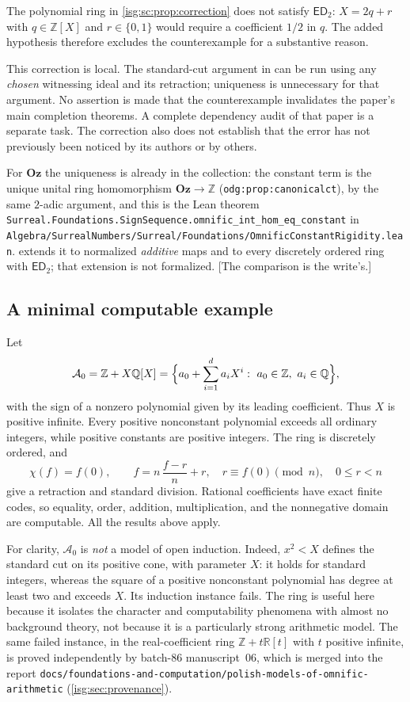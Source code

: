 \documentclass[11pt]{article}
\theoremstyle{definition}
\theoremstyle{remark}
\newcommand{\Oz}{\ensuremath{\mathbf{Oz}}}
\newcommand{\R}{\mathbb{R}}
\newcommand{\Z}{\mathbb{Z}}
\newcommand{\Q}{\mathbb{Q}}
\newcommand{\ED}{\mathsf{ED}}
\newcommand{\Asc}{\mathcal{A}}
\newcommand{\replabel}[1]{\nolinkurl{#1}}
\newcommand{\fn}[1]{\nolinkurl{#1}}
\begin{document}
The polynomial ring in \cref{isg:sc:prop:correction} does not satisfy
$\ED_2$: $X=2q+r$ with $q\in\Z[X]$ and $r\in\{0,1\}$ would require a
coefficient $1/2$ in $q$. The added hypothesis therefore excludes the
counterexample for a substantive reason.

This correction is local. The standard-cut argument in
\cite[Theorem~2.9]{ELV} can be run using any \emph{chosen} witnessing
ideal and its retraction; uniqueness is unnecessary for that argument. No
assertion is made that the counterexample invalidates the paper's main
completion theorems. A complete dependency audit of that paper is a
separate task. The correction also does not establish that the error has
not previously been noticed by its authors or by others.

For $\Oz$ the uniqueness is already in the collection: the constant term
is the unique unital ring homomorphism $\Oz\to\Z$
(\replabel{odg:prop:canonicalct}), by the same $2$-adic argument, and this
is the Lean theorem
\fn{Surreal.Foundations.SignSequence.omnific_int_hom_eq_constant} in
\fn{Algebra/SurrealNumbers/Surreal/Foundations/OmnificConstantRigidity.lean}.
 extends it to normalized \emph{additive} maps and
to every discretely ordered ring with $\ED_2$; that extension is not
formalized. \textup{[}The comparison is the write's.\textup{]}

\subsection{A minimal computable example}
Let
\begin{equation}\label{isg:sc:eq:A0}
 \Asc_0=\Z+X\Q[X]
 =\Bigl\{a_0+\sum_{i=1}^d a_iX^i:\ a_0\in\Z,\ a_i\in\Q\Bigr\},
\end{equation}
with the sign of a nonzero polynomial given by its leading coefficient.
Thus $X$ is positive infinite. Every positive nonconstant polynomial
exceeds all ordinary integers, while positive constants are positive
integers. The ring is discretely ordered, and
\[
 \chi(f)=f(0),\qquad
 f=n\,\frac{f-r}{n}+r,\quad r\equiv f(0)\pmod n,\quad 0\le r<n
\]
give a retraction and standard division. Rational coefficients have exact
finite codes, so equality, order, addition, multiplication, and the
nonnegative domain are computable. All the results above apply.

For clarity, $\Asc_0$ is \emph{not} a model of open induction. Indeed,
$x^2<X$ defines the standard cut on its positive cone, with parameter $X$:
it holds for standard integers, whereas the square of a positive
nonconstant polynomial has degree at least two and exceeds $X$. Its
induction instance fails. The ring is useful here because it isolates the
character and computability phenomena with almost no background theory,
not because it is a particularly strong arithmetic model. The same failed
instance, in the real-coefficient ring $\Z+t\R[t]$ with $t$ positive
infinite, is proved independently by batch-86 manuscript~06, which is
merged into the report
\nolinkurl{docs/foundations-and-computation/polish-models-of-omnific-arithmetic}
(\cref{isg:sec:provenance}).
\end{document}
